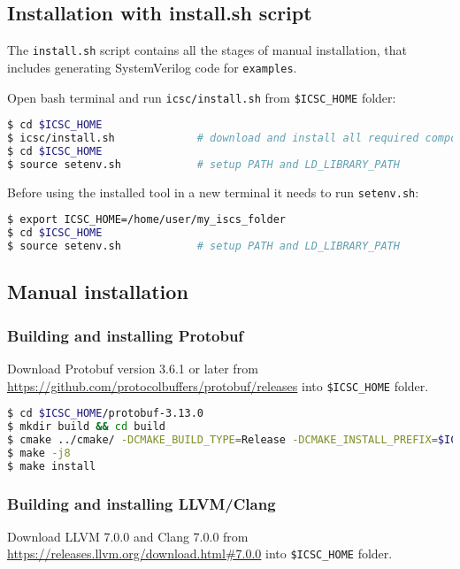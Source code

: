\subsection{Installation with install.sh script}

The {\tt install.sh} script contains all the stages of manual installation, that includes generating SystemVerilog code for {\tt examples}.

Open bash terminal and run {\tt icsc/install.sh} from {\tt \$ICSC\_HOME} folder:
%
\begin{lstlisting}[language=bash]
$ cd $ICSC_HOME  
$ icsc/install.sh             # download and install all required components
$ cd $ICSC_HOME
$ source setenv.sh            # setup PATH and LD_LIBRARY_PATH
\end{lstlisting}

Before using the installed tool in a new terminal it needs to run {\tt setenv.sh}:
\begin{lstlisting}[language=bash]
$ export ICSC_HOME=/home/user/my_iscs_folder     
$ cd $ICSC_HOME
$ source setenv.sh            # setup PATH and LD_LIBRARY_PATH 
\end{lstlisting}

\subsection{Manual installation}


\subsubsection{Building and installing Protobuf}

Download Protobuf version 3.6.1 or later from \url{https://github.com/protocolbuffers/protobuf/releases} into {\tt \$ICSC\_HOME} folder.

\begin{lstlisting}[language=bash]
$ cd $ICSC_HOME/protobuf-3.13.0
$ mkdir build && cd build
$ cmake ../cmake/ -DCMAKE_BUILD_TYPE=Release -DCMAKE_INSTALL_PREFIX=$ICSC_HOME -DBUILD_SHARED_LIBS=ON
$ make -j8
$ make install
\end{lstlisting}


\subsubsection{Building and installing LLVM/Clang}

Download LLVM 7.0.0 and Clang 7.0.0 from \url{https://releases.llvm.org/download.html#7.0.0} into {\tt \$ICSC\_HOME} folder.

